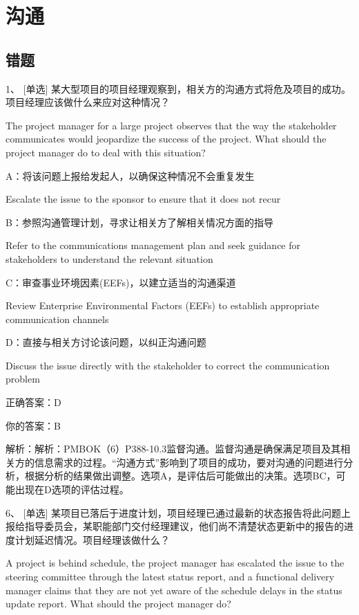 
\chapter{沟通}

\section{错题}

1、 [单选] 某大型项目的项目经理观察到，相关方的沟通方式将危及项目的成功。项目经理应该做什么来应对这种情况？

The project manager for a large project observes that the way the stakeholder communicates would jeopardize the success of the project. What should the project manager do to deal with this situation?

A：将该问题上报给发起人，以确保这种情况不会重复发生

Escalate the issue to the sponsor to ensure that it does not recur

B：参照沟通管理计划，寻求让相关方了解相关情况方面的指导

Refer to the communications management plan and seek guidance for stakeholders to understand the relevant situation

C：审查事业环境因素(EEFs)，以建立适当的沟通渠道

Review Enterprise Environmental Factors (EEFs) to establish appropriate communication channels

D：直接与相关方讨论该问题，以纠正沟通问题

Discuss the issue directly with the stakeholder to correct the communication problem

正确答案：D

你的答案：B

解析：解析：PMBOK（6）P388-10.3监督沟通。监督沟通是确保满足项目及其相关方的信息需求的过程。“沟通方式”影响到了项目的成功，要对沟通的问题进行分析，根据分析的结果做出调整。选项A，是评估后可能做出的决策。选项BC，可能出现在D选项的评估过程。



6、 [单选] 某项目已落后于进度计划，项目经理已通过最新的状态报告将此问题上报给指导委员会，某职能部门交付经理建议，他们尚不清楚状态更新中的报告的进度计划延迟情况。项目经理该做什么？

A project is behind schedule, the project manager has escalated the issue to the steering committee through the latest status report, and a functional delivery manager claims that they are not yet aware of the schedule delays in the status update report. What should the project manager do?

